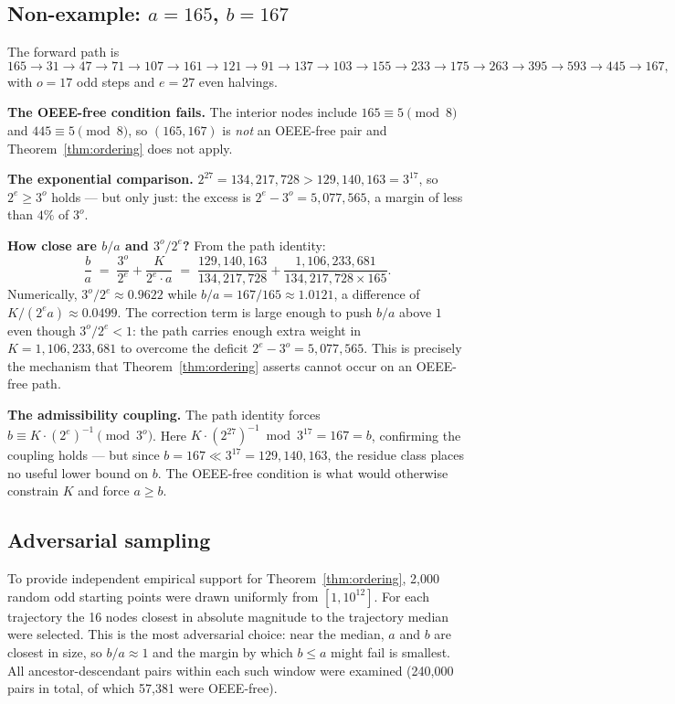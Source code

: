 \documentclass[11pt]{article}
\begin{document}
\subsection*{Non-example: $a=165$, $b=167$}

The forward path is
\[
  165 \to 31 \to 47 \to 71 \to 107 \to 161 \to 121 \to 91 \to 137
      \to 103 \to 155 \to 233 \to 175 \to 263 \to 395 \to 593 \to 445 \to 167,
\]
with $o = 17$ odd steps and $e = 27$ even halvings.

\medskip\noindent\textbf{The OEEE-free condition fails.}
The interior nodes include $165 \equiv 5\pmod{8}$ and $445 \equiv 5\pmod{8}$,
so $(165, 167)$ is \emph{not} an OEEE-free pair and Theorem~\ref{thm:ordering}
does not apply.

\medskip\noindent\textbf{The exponential comparison.}
$2^{27} = 134{,}217{,}728 > 129{,}140{,}163 = 3^{17}$, so $2^e \geq 3^o$
holds — but only just: the excess is $2^e - 3^o = 5{,}077{,}565$, a margin
of less than $4\%$ of $3^o$.

\medskip\noindent\textbf{How close are $b/a$ and $3^o/2^e$?}
From the path identity:
\[
  \frac{b}{a} \;=\; \frac{3^o}{2^e} + \frac{K}{2^e \cdot a}
  \;=\; \frac{129{,}140{,}163}{134{,}217{,}728} + \frac{1{,}106{,}233{,}681}{134{,}217{,}728 \times 165}.
\]
Numerically, $3^o/2^e \approx 0.9622$ while $b/a = 167/165 \approx 1.0121$,
a difference of $K/(2^e a) \approx 0.0499$.  The correction term is large
enough to push $b/a$ above $1$ even though $3^o/2^e < 1$: the path carries
enough extra weight in $K = 1{,}106{,}233{,}681$ to overcome the deficit
$2^e - 3^o = 5{,}077{,}565$.  This is precisely the mechanism that
Theorem~\ref{thm:ordering} asserts cannot occur on an OEEE-free path.

\medskip\noindent\textbf{The admissibility coupling.}
The path identity forces $b \equiv K \cdot (2^e)^{-1} \pmod{3^o}$.
Here $K \cdot (2^{27})^{-1} \bmod 3^{17} = 167 = b$, confirming the
coupling holds — but since $b = 167 \ll 3^{17} = 129{,}140{,}163$, the
residue class places no useful lower bound on $b$.  The OEEE-free condition
is what would otherwise constrain $K$ and force $a \geq b$.

\subsection*{Adversarial sampling}

To provide independent empirical support for Theorem~\ref{thm:ordering}, 2{,}000 random odd starting
points were drawn uniformly from $[1, 10^{12}]$.  For each trajectory the
16 nodes closest in absolute magnitude to the trajectory median were
selected.  This is the most adversarial choice: near the median, $a$ and
$b$ are closest in size, so $b/a \approx 1$ and the margin by which
$b \leq a$ might fail is smallest.  All ancestor-descendant pairs within
each such window were examined (240{,}000 pairs in total, of which 57{,}381
were OEEE-free).
\end{document}
